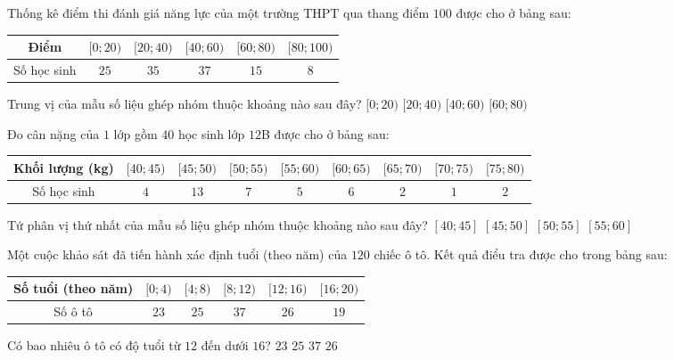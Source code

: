\begin{ex}%
	Thống kê điểm thi đánh giá năng lực của một trường THPT qua thang điểm $100$ được cho ở bảng sau:
	\begin{center}
		\begin{tabular}{|c|c|c|c|c|c|}
			\hline
			Điểm & $[0;20)$ & $[20;40)$ & $[40;60)$ & $[60;80)$ & $[80;100)$ \\
			\hline
			Số học sinh & $25$ & $35$ & $37$ & $15$ & $8$ \\
			\hline
		\end{tabular}
	\end{center}
	Trung vị của mẫu số liệu ghép nhóm thuộc khoảng nào sau đây?
	\choice
	{$[0;20)$}
	{$[20;40)$}
	{\True $[40;60)$}
	{$[60;80)$}
\end{ex}
\begin{ex}%
	Đo cân nặng của $1$ lớp gồm $40$ học sinh lớp $12$B được cho ở bảng sau:
	\begin{center}
		\begin{tabular}{|c|c|c|c|c|c|c|c|c|}
			\hline
			Khối lượng (kg) & $[40;45)$ & $[45;50)$ & $[50;55)$ & $[55;60)$ & $[60;65)$ & $[65;70)$ & $[70;75)$ & $[75;80)$ \\
			\hline
			Số học sinh & $4$ & $13$ & $7$ & $5$ & $6$ & $2$ & $1$ & $2$ \\
			\hline
		\end{tabular}
	\end{center}
	Tứ phân vị thứ nhất của mẫu số liệu ghép nhóm thuộc khoảng nào sau đây?
	\choice
	{$[40;45]$}
	{\True $[45;50]$}
	{$[50;55]$}
	{$[55;60]$}
\end{ex}
\begin{ex}%
	Một cuộc khảo sát đã tiến hành xác định tuổi (theo năm) của $120$ chiếc ô tô. Kết quả điểu tra được cho trong bảng sau:
	\begin{center}
		\begin{tabular}{|c|c|c|c|c|c|}
			\hline
			Số tuổi (theo năm) & $[0;4)$ & $[4;8)$ & $[8;12)$ & $[12;16)$ & $[16;20)$ \\
			\hline
			Số ô tô & $23$ & $25$ & $37$ & $26$ & $19$ \\
			\hline
		\end{tabular}
	\end{center}
	Có bao nhiêu ô tô có độ tuổi từ $12$ đến dưới $16$?
	\choice
	{$23$}
	{$25$}
	{$37$}
	{\True $26$}
	\loigiai{}
\end{ex}
